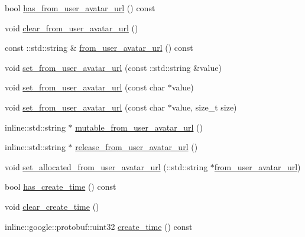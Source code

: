 \begin{DoxyCompactItemize}
\item 
bool \hyperlink{class_i_m_1_1_base_define_1_1_client_msg_info_a64917b4214e5da6e5f80ed4ec3e79a47}{has\+\_\+from\+\_\+user\+\_\+avatar\+\_\+url} () const 
\item 
void \hyperlink{class_i_m_1_1_base_define_1_1_client_msg_info_a50aa52bbd7c0e65600dfdeb513abf3e8}{clear\+\_\+from\+\_\+user\+\_\+avatar\+\_\+url} ()
\item 
const \+::std\+::string \& \hyperlink{class_i_m_1_1_base_define_1_1_client_msg_info_a21c1a07ef3d2e60a8a446f5743a7e5a9}{from\+\_\+user\+\_\+avatar\+\_\+url} () const 
\item 
void \hyperlink{class_i_m_1_1_base_define_1_1_client_msg_info_a89e7eb54993cb3e1369bdd0c36a22648}{set\+\_\+from\+\_\+user\+\_\+avatar\+\_\+url} (const \+::std\+::string \&value)
\item 
void \hyperlink{class_i_m_1_1_base_define_1_1_client_msg_info_a36ce84292f1e9a6596dd19b2cd77493c}{set\+\_\+from\+\_\+user\+\_\+avatar\+\_\+url} (const char $\ast$value)
\item 
void \hyperlink{class_i_m_1_1_base_define_1_1_client_msg_info_aebeb93a247efbad3083d531fa778c895}{set\+\_\+from\+\_\+user\+\_\+avatar\+\_\+url} (const char $\ast$value, size\+\_\+t size)
\item 
inline\+::std\+::string $\ast$ \hyperlink{class_i_m_1_1_base_define_1_1_client_msg_info_a884c735b67833296937f3d1a43c598db}{mutable\+\_\+from\+\_\+user\+\_\+avatar\+\_\+url} ()
\item 
inline\+::std\+::string $\ast$ \hyperlink{class_i_m_1_1_base_define_1_1_client_msg_info_af72caf41b43660a659e8fa6bac86379a}{release\+\_\+from\+\_\+user\+\_\+avatar\+\_\+url} ()
\item 
void \hyperlink{class_i_m_1_1_base_define_1_1_client_msg_info_af806b6e63548104da40478e969b10a18}{set\+\_\+allocated\+\_\+from\+\_\+user\+\_\+avatar\+\_\+url} (\+::std\+::string $\ast$\hyperlink{class_i_m_1_1_base_define_1_1_client_msg_info_a21c1a07ef3d2e60a8a446f5743a7e5a9}{from\+\_\+user\+\_\+avatar\+\_\+url})
\item 
bool \hyperlink{class_i_m_1_1_base_define_1_1_client_msg_info_af285865c997128d776f44f76f0195863}{has\+\_\+create\+\_\+time} () const 
\item 
void \hyperlink{class_i_m_1_1_base_define_1_1_client_msg_info_a9ef04df24f14f4c6d1e8993fd6b319a2}{clear\+\_\+create\+\_\+time} ()
\item 
inline\+::google\+::protobuf\+::uint32 \hyperlink{class_i_m_1_1_base_define_1_1_client_msg_info_ab5eade81a6199874b4151bb7391e5865}{create\+\_\+time} () const 

\end{DoxyCompactItemize}
